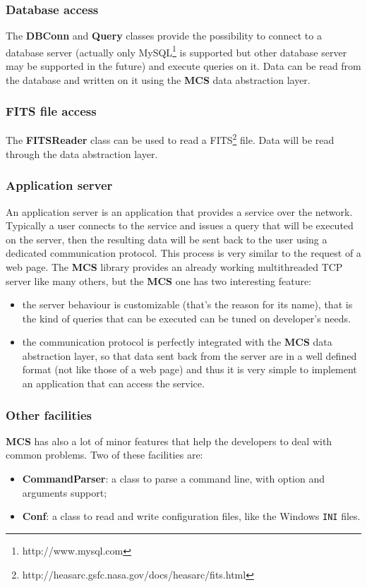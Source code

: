 \documentclass[12pt,titlepage]{article}
\newcommand{\mcs}{\textbf{MCS} }
\begin{document}
%
\subsubsection{Database access}
The \textbf{DBConn} and \textbf{Query} classes provide the
possibility to connect to a database server (actually only
MySQL\footnote{http://www.mysql.com} is supported but other database
server may be supported in the future) and execute queries on it. Data
can be read from the database and written on it using the \mcs data
abstraction layer.

%
\subsubsection{FITS file access}
The \textbf{FITSReader} class can be used to read a
FITS\footnote{http://heasarc.gsfc.nasa.gov/docs/heasarc/fits.html} file. Data
will be read through the data abstraction layer.


%
\subsubsection{Application server}
An application server is an application that provides a service over
the network. Typically a user connects to the service and issues a query
that will be executed on the server, then the resulting data will be
sent back to the user using a dedicated communication protocol. This
process is very similar to the request of a web page. The \mcs library
provides an already working multithreaded TCP server like many others,
but the \mcs one has two interesting feature:

\begin{itemize}
\item the server behaviour is customizable (that's the reason for its
  name), that is the kind of queries that can be executed can be tuned
  on developer's needs.

\item the communication protocol is perfectly integrated with the
  \mcs data abstraction layer, so that data sent back from the
  server are in a well defined format (not like those of a web page)
  and thus it is very simple to implement an application that can
  access the service.
\end{itemize}


%
\subsubsection{Other facilities}
\mcs has also a lot of minor features that help the developers to deal
with common problems. Two of these facilities are:
\begin{itemize}
\item \textbf{CommandParser}: a class to parse a command line, with
  option and arguments support;

\item \textbf{Conf}: a class to read and write configuration files,
  like the Windows \verb|INI| files.
\end{itemize}
\end{document}
